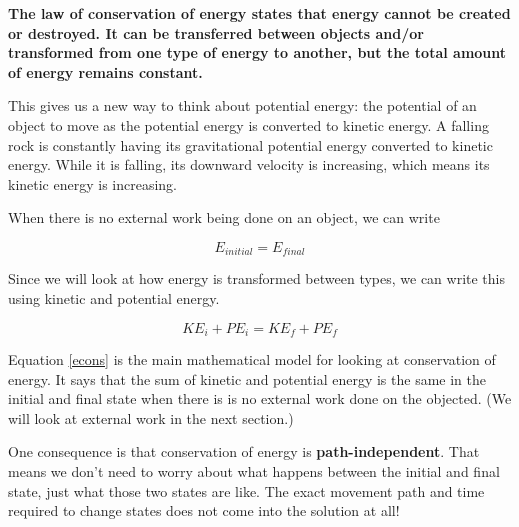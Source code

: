 \documentclass[12pt]{book}
\begin{document}
\linespace

\textbf{The law of conservation of energy states that energy cannot be created or destroyed. It can be transferred between objects and/or transformed from one type of energy to another, but the total amount of energy remains constant.}

\linespace

This gives us a new way to think about potential energy: the potential of an object to move as the potential energy is converted to kinetic energy. A falling rock is constantly having its gravitational potential energy converted to kinetic energy. While it is falling, its downward velocity is increasing, which means its kinetic energy is increasing.

When there is no external work being done on an object, we can write

\begin{equation}
E_{initial} = E_{final}
\end{equation}

Since we will look at how energy is transformed between types, we can write this using kinetic and potential energy.

\begin{equation}
KE_i + PE_i = KE_f + PE_f
\label{econs}
\end{equation}

Equation \ref{econs} is the main mathematical model for looking at conservation of energy. It says that the sum of kinetic and potential energy is the same in the initial and final state when there is is no external work done on the objected. (We will look at external work in the next section.)

One consequence is that conservation of energy is \textbf{path-independent}. That means we don't need to worry about what happens between the initial and final state, just what those two states are like. The exact movement path and time required to change states does not come into the solution at all!
\end{document}

